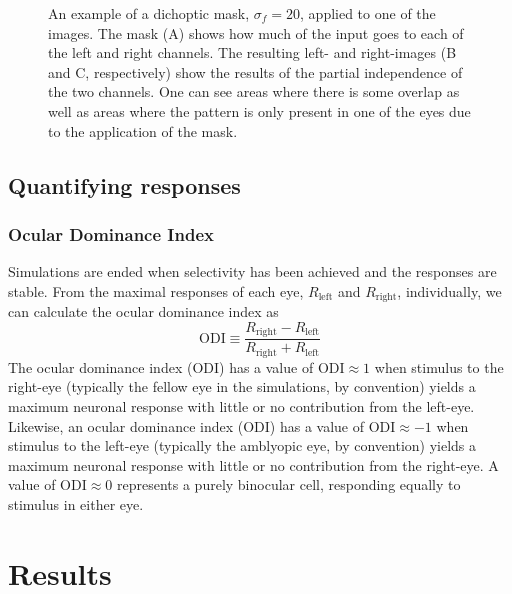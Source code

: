 \documentclass[
  onecolumn]{article}
\begin{document}
\begin{figure}
\hypertarget{fig:dichopic_filter_image}{%
\centering

\caption{An example of a dichoptic mask, \(\sigma_f = 20\), applied to
one of the images. The mask (A) shows how much of the input goes to each
of the left and right channels. The resulting left- and right-images (B
and C, respectively) show the results of the partial independence of the
two channels. One can see areas where there is some overlap as well as
areas where the pattern is only present in one of the eyes due to the
application of the mask.}\label{fig:dichopic_filter_image}
}
\end{figure}

\hypertarget{quantifying-responses}{%
\subsection{Quantifying responses}\label{quantifying-responses}}

\hypertarget{ocular-dominance-index}{%
\subsubsection{Ocular Dominance Index}\label{ocular-dominance-index}}

Simulations are ended when selectivity has been achieved and the
responses are stable. From the maximal responses of each eye,
\(R_{\text{left}}\) and \(R_{\text{right}}\), individually, we can
calculate the ocular dominance index as \[
\text{ODI} \equiv \frac{R_{\text{right}}-R_{\text{left}}}{R_{\text{right}}+R_{\text{left}}}
\] The ocular dominance index (ODI) has a value of
\(\text{ODI} \approx 1\) when stimulus to the right-eye (typically the
fellow eye in the simulations, by convention) yields a maximum neuronal
response with little or no contribution from the left-eye. Likewise, an
ocular dominance index (ODI) has a value of \(\text{ODI} \approx -1\)
when stimulus to the left-eye (typically the amblyopic eye, by
convention) yields a maximum neuronal response with little or no
contribution from the right-eye. A value of \(\text{ODI} \approx 0\)
represents a purely binocular cell, responding equally to stimulus in
either eye.

\hypertarget{results}{%
\section{Results}\label{results}}
\end{document}
